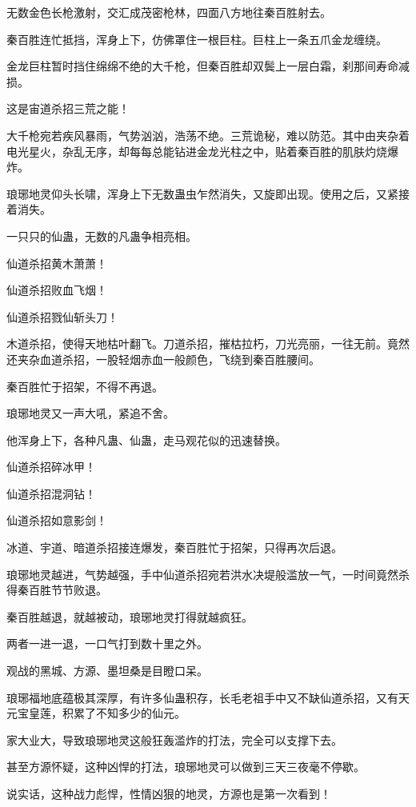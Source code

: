 \begin{this_body}
无数金色长枪激射，交汇成茂密枪林，四面八方地往秦百胜射去。

秦百胜连忙抵挡，浑身上下，仿佛罩住一根巨柱。巨柱上一条五爪金龙缠绕。

金龙巨柱暂时挡住绵绵不绝的大千枪，但秦百胜却双鬓上一层白霜，刹那间寿命减损。

这是宙道杀招三荒之能！

大千枪宛若疾风暴雨，气势汹汹，浩荡不绝。三荒诡秘，难以防范。其中由夹杂着电光星火，杂乱无序，却每每总能钻进金龙光柱之中，贴着秦百胜的肌肤灼烧爆炸。

琅琊地灵仰头长啸，浑身上下无数蛊虫乍然消失，又旋即出现。使用之后，又紧接着消失。

一只只的仙蛊，无数的凡蛊争相亮相。

仙道杀招黄木萧萧！

仙道杀招败血飞烟！

仙道杀招戮仙斩头刀！

木道杀招，使得天地枯叶翻飞。刀道杀招，摧枯拉朽，刀光亮丽，一往无前。竟然还夹杂血道杀招，一股轻烟赤血一般颜色，飞绕到秦百胜腰间。

秦百胜忙于招架，不得不再退。

琅琊地灵又一声大吼，紧追不舍。

他浑身上下，各种凡蛊、仙蛊，走马观花似的迅速替换。

仙道杀招碎冰甲！

仙道杀招混洞钻！

仙道杀招如意影剑！

冰道、宇道、暗道杀招接连爆发，秦百胜忙于招架，只得再次后退。

琅琊地灵越进，气势越强，手中仙道杀招宛若洪水决堤般滥放一气，一时间竟然杀得秦百胜节节败退。

秦百胜越退，就越被动，琅琊地灵打得就越疯狂。

两者一进一退，一口气打到数十里之外。

观战的黑城、方源、墨坦桑是目瞪口呆。

琅琊福地底蕴极其深厚，有许多仙蛊积存，长毛老祖手中又不缺仙道杀招，又有天元宝皇莲，积累了不知多少的仙元。

家大业大，导致琅琊地灵这般狂轰滥炸的打法，完全可以支撑下去。

甚至方源怀疑，这种凶悍的打法，琅琊地灵可以做到三天三夜毫不停歇。

说实话，这种战力彪悍，性情凶狠的地灵，方源也是第一次看到！

\end{this_body}


